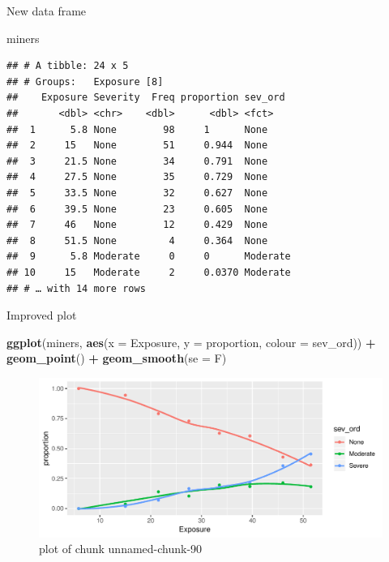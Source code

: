 \documentclass[ignorenonframetext,]{beamer}
\newenvironment{Shaded}{\begin{snugshade}}{\end{snugshade}}
\newcommand{\DataTypeTok}[1]{\textcolor[rgb]{0.13,0.29,0.53}{#1}}
\newcommand{\KeywordTok}[1]{\textcolor[rgb]{0.13,0.29,0.53}{\textbf{#1}}}
\newcommand{\NormalTok}[1]{#1}
\newcommand{\OperatorTok}[1]{\textcolor[rgb]{0.81,0.36,0.00}{\textbf{#1}}}
\newcommand{\StringTok}[1]{\textcolor[rgb]{0.31,0.60,0.02}{#1}}
\begin{document}
\begin{frame}[fragile]{New data frame}
\protect\hypertarget{new-data-frame}{}

\small

\begin{Shaded}
\begin{Highlighting}[]
\NormalTok{miners}
\end{Highlighting}
\end{Shaded}

\begin{verbatim}
## # A tibble: 24 x 5
## # Groups:   Exposure [8]
##    Exposure Severity  Freq proportion sev_ord 
##       <dbl> <chr>    <dbl>      <dbl> <fct>   
##  1      5.8 None        98     1      None    
##  2     15   None        51     0.944  None    
##  3     21.5 None        34     0.791  None    
##  4     27.5 None        35     0.729  None    
##  5     33.5 None        32     0.627  None    
##  6     39.5 None        23     0.605  None    
##  7     46   None        12     0.429  None    
##  8     51.5 None         4     0.364  None    
##  9      5.8 Moderate     0     0      Moderate
## 10     15   Moderate     2     0.0370 Moderate
## # … with 14 more rows
\end{verbatim}

\normalsize

\end{frame}

\begin{frame}[fragile]{Improved plot}
\protect\hypertarget{improved-plot}{}

\begin{Shaded}
\begin{Highlighting}[]
\KeywordTok{ggplot}\NormalTok{(miners, }\KeywordTok{aes}\NormalTok{(}\DataTypeTok{x =}\NormalTok{ Exposure, }\DataTypeTok{y =}\NormalTok{ proportion,}
                   \DataTypeTok{colour =}\NormalTok{ sev_ord)) }\OperatorTok{+}\StringTok{ }
\StringTok{  }\KeywordTok{geom_point}\NormalTok{() }\OperatorTok{+}\StringTok{ }\KeywordTok{geom_smooth}\NormalTok{(}\DataTypeTok{se =}\NormalTok{ F)}
\end{Highlighting}
\end{Shaded}

\begin{figure}
\centering
\includegraphics{figure/unnamed-chunk-90-1.pdf}
\caption{plot of chunk unnamed-chunk-90}
\end{figure}

\end{frame}
\end{document}
